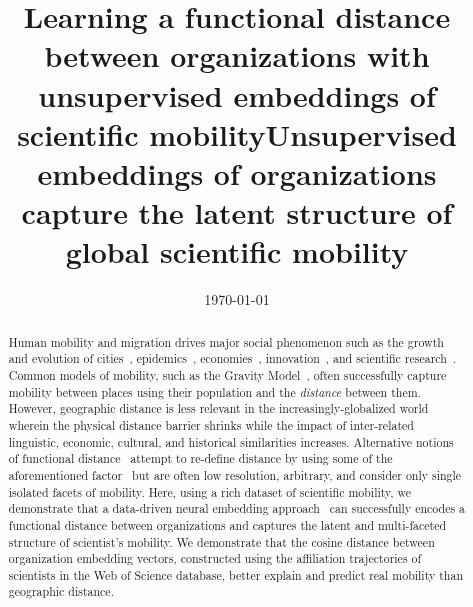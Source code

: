 \documentclass[12pt]{article} %
\begin{document}
\title{Learning a functional distance between organizations with unsupervised embeddings of scientific mobility}
\title{Unsupervised embeddings of organizations capture the latent structure of global scientific mobility} %
\date{\today}
\maketitle %

%
%

\begin{abstract}


Human mobility and migration drives major social phenomenon such as the growth and evolution of cities~\autocite{wef2017migration, curiel2018citygravity},  epidemics~\autocite{kraemer2020covid, truscott2012epidemicgravity, xia2005measlesgravity}, economies~\autocite{kaluza2010cargo, kerr2011immigration}, innovation~\autocite{kaiser2018innovation, armano2017innovation},  and scientific research~\autocite{sugimoto2017mostimpact, petersen2018multiscale, franzoni2014advantage, morgan2018prestige, rodrigues2016mobility}. 
Common models of mobility, such as the Gravity Model~\autocite{zipf1946gravity, xia2005measlesgravity, jung2008highwaygravity, barbosa2018human, curiel2018citygravity, lewer2008immigrationgravity, hong2016busgravity, truscott2012epidemicgravity, xia2005measlesgravity}, often successfully capture mobility between places using their population and the \textit{distance} between them.
However, geographic distance is less relevant in the increasingly-globalized world~\autocite{czaika2018migration, czaika2018globalisation, buchan2009globalization, altbach2004globalization} wherein the physical distance barrier shrinks while the impact of inter-related linguistic, economic, cultural, and historical similarities increases.
Alternative notions of functional distance~\autocite{brown1970migration, brown1970functional, kim2018functional} attempt to re-define distance by using some of the aforementioned factor~\autocite{boschma2005proximity,  brown1970functional, brown1970migration, kim2018functional} but are often low resolution, arbitrary, and consider only single isolated facets of mobility. 
Here, using a rich dataset of scientific mobility, we demonstrate that a data-driven neural embedding approach~\autocite{mikolov2013word2vec} can successfully encodes a functional distance between organizations and captures the latent and multi-faceted structure of scientist's mobility.
We demonstrate that the cosine distance between organization embedding vectors, constructed using the affiliation trajectories of scientists in the Web of Science database, better explain and predict real mobility than geographic distance. 

\end{abstract}
\end{document}
